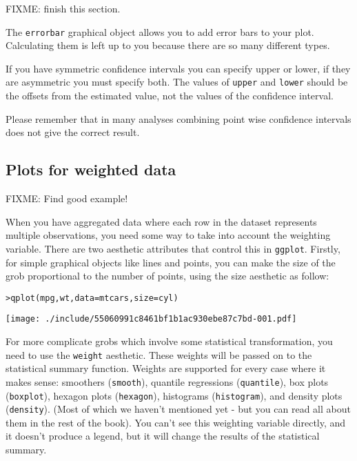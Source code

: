 FIXME: finish this section.

The {\tt errorbar} graphical object allows you to add error bars to your plot.  Calculating them is left up to you because there are so many different types. 

If you have symmetric confidence intervals you can specify upper or lower, if they are asymmetric you must specify both.  The values of {\tt upper} and {\tt lower} should be the offsets from the estimated value, not the values of the confidence interval.

Please remember that in many analyses combining point wise confidence intervals does not give the correct result.

\subsection{Plots for weighted data}\label{sec:weighted_data}

FIXME: Find good example!

When you have aggregated data where each row in the dataset represents multiple observations, you need some way to take into account the weighting variable.  There are two aesthetic attributes that control this in {\tt ggplot}.  Firstly, for simple graphical objects like lines and points, you can make the size of the grob proportional to the number of points, using the size aesthetic as follow:

\begin{alltt}
> qplot(mpg, wt, data = mtcars, size = cyl)
\end{alltt}
\texttt{[image: ./include/55060991c8461bf1b1ac930ebe87c7bd-001.pdf]}
\begin{alltt}

\end{alltt}%

For more complicate grobs which involve some statistical transformation, you need to use the {\tt weight} aesthetic.  These weights will be passed on to the statistical summary function.  Weights are supported for every case where it makes sense: smoothers ({\tt smooth}), quantile regressions ({\tt quantile}), box plots ({\tt boxplot}), hexagon plots ({\tt hexagon}), histograms ({\tt histogram}), and density plots ({\tt density}).  (Most of which we haven't mentioned yet - but you can read all about them in the rest of the book).  You can't see this weighting variable directly, and it doesn't produce a legend, but it will change the results of the statistical summary.

